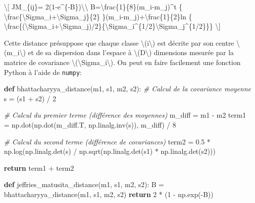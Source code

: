 \documentclass[
]{article}
\newenvironment{Shaded}{}{}
\newcommand{\CommentTok}[1]{\textcolor[rgb]{0.38,0.63,0.69}{\textit{#1}}}
\newcommand{\ControlFlowTok}[1]{\textcolor[rgb]{0.00,0.44,0.13}{\textbf{#1}}}
\newcommand{\DecValTok}[1]{\textcolor[rgb]{0.25,0.63,0.44}{#1}}
\newcommand{\FloatTok}[1]{\textcolor[rgb]{0.25,0.63,0.44}{#1}}
\newcommand{\KeywordTok}[1]{\textcolor[rgb]{0.00,0.44,0.13}{\textbf{#1}}}
\newcommand{\NormalTok}[1]{#1}
\newcommand{\OperatorTok}[1]{\textcolor[rgb]{0.40,0.40,0.40}{#1}}
\begin{document}
{\textbackslash{[} JM\_\{ij\}=
2(1-e\^{}\{-B\})\textbackslash\textbackslash{}
B=\textbackslash frac\{1\}\{8\}(m\_i-m\_j)\^{}t \{
\textbackslash frac\{\textbackslash Sigma\_i+\textbackslash Sigma\_j\}\{2\}
\}(m\_i-m\_j)+\textbackslash frac\{1\}\{2\}ln \{
\textbackslash frac\{\textbar(\textbackslash Sigma\_i+\textbackslash Sigma\_j)/2\textbar\}\{\textbar\textbackslash Sigma\_i\textbar\^{}\{1/2\}\textbar\textbackslash Sigma\_j\textbar\^{}\{1/2\}\}\}
\textbackslash{]}}

Cette distance présuppose que chaque classe
{\textbackslash(i\textbackslash)} est décrite par son centre
{\textbackslash(m\_i\textbackslash)} et de sa dispersion dans l'espace à
{\textbackslash(D\textbackslash)} dimensions mesurée par la matrice de
covariance {\textbackslash(\textbackslash Sigma\_i\textbackslash)}. On
peut en faire facilement une fonction Python à l'aide de \texttt{numpy}:

\label{dda7b492}
\label{cb13}
\begin{Shaded}
\begin{Highlighting}[]
\KeywordTok{def}\NormalTok{ bhattacharyya\_distance(m1, s1, m2, s2):}
    \CommentTok{\# Calcul de la covariance moyenne}
\NormalTok{    s }\OperatorTok{=}\NormalTok{ (s1 }\OperatorTok{+}\NormalTok{ s2) }\OperatorTok{/} \DecValTok{2}
    
    \CommentTok{\# Calcul du premier terme (différence des moyennes)}
\NormalTok{    m\_diff }\OperatorTok{=}\NormalTok{ m1 }\OperatorTok{{-}}\NormalTok{ m2}
\NormalTok{    term1 }\OperatorTok{=}\NormalTok{ np.dot(np.dot(m\_diff.T, np.linalg.inv(s)), m\_diff) }\OperatorTok{/} \DecValTok{8}
    
    \CommentTok{\# Calcul du second terme (différence de covariances)}
\NormalTok{    term2 }\OperatorTok{=} \FloatTok{0.5} \OperatorTok{*}\NormalTok{ np.log(np.linalg.det(s) }\OperatorTok{/}\NormalTok{ np.sqrt(np.linalg.det(s1) }\OperatorTok{*}\NormalTok{ np.linalg.det(s2)))}
    
    \ControlFlowTok{return}\NormalTok{ term1 }\OperatorTok{+}\NormalTok{ term2}

\KeywordTok{def}\NormalTok{ jeffries\_matusita\_distance(m1, s1, m2, s2):}
\NormalTok{    B }\OperatorTok{=}\NormalTok{ bhattacharyya\_distance(m1, s1, m2, s2)}
    \ControlFlowTok{return} \DecValTok{2} \OperatorTok{*}\NormalTok{ (}\DecValTok{1} \OperatorTok{{-}}\NormalTok{ np.exp(}\OperatorTok{{-}}\NormalTok{B))}
\end{Highlighting}
\end{Shaded}
\end{document}
